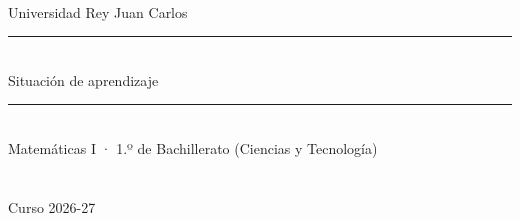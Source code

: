 
\thispagestyle{empty}
\vspace*{3.2cm}
\begin{center}
  {\small\color{pistagris}\MakeUppercase{\master}\\ Universidad Rey Juan Carlos}\\[1.4em]
  {\color{urjc}\rule{\linewidth}{1.2pt}}\\[1.2em]
  {\fontsize{13}{16}\selectfont\color{titular} Situación de aprendizaje}\\[0.8em]
  {\fontsize{25}{31}\selectfont\bfseries\color{titular}\tituloSA\par}
  \vspace{1em}
  {\color{urjc}\rule{\linewidth}{1.2pt}}\\[1.4em]
  {\large Matemáticas I · 1.º de Bachillerato (Ciencias y Tecnología)}\\[0.4em]
  {\large\color{pistagris}\asignatura}\\[3em]
  {\large\bfseries\autor}\\[0.4em]
  {\small\color{pistagris}Curso 2026-27}
\end{center}
\clearpage

{\setlength{\parskip}{0pt}\tableofcontents}
\clearpage
